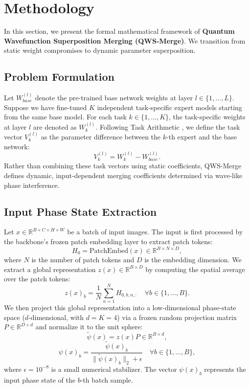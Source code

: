 \section{Methodology}
\label{sec:method}

In this section, we present the formal mathematical framework of \textbf{Quantum Wavefunction Superposition Merging (QWS-Merge)}. We transition from static weight compromises to dynamic parameter superposition.

\subsection{Problem Formulation}
Let $W_{base}^{(l)}$ denote the pre-trained base network weights at layer $l \in \{1, \dots, L\}$. Suppose we have fine-tuned $K$ independent task-specific expert models starting from the same base model. For each task $k \in \{1, \dots, K\}$, the task-specific weights at layer $l$ are denoted as $W_k^{(l)}$. Following Task Arithmetic \cite{ilharco2022editing}, we define the task vector $V_k^{(l)}$ as the parameter difference between the $k$-th expert and the base network:
\begin{equation}
    V_k^{(l)} = W_k^{(l)} - W_{base}^{(l)}.
\end{equation}
Rather than combining these task vectors using static coefficients, QWS-Merge defines dynamic, input-dependent merging coefficients determined via wave-like phase interference.

\subsection{Input Phase State Extraction}
Let $x \in \mathbb{R}^{B \times C \times H \times W}$ be a batch of input images. The input is first processed by the backbone's frozen patch embedding layer to extract patch tokens:
\begin{equation}
    H_0 = \text{PatchEmbed}(x) \in \mathbb{R}^{B \times N \times D},
\end{equation}
where $N$ is the number of patch tokens and $D$ is the embedding dimension. We extract a global representation $z(x) \in \mathbb{R}^{B \times D}$ by computing the spatial average over the patch tokens:
\begin{equation}
    z(x)_b = \frac{1}{N} \sum_{n=1}^N H_{0, b, n, :} \quad \forall b \in \{1, \dots, B\}.
\end{equation}
We then project this global representation into a low-dimensional phase-state space ($d$-dimensional, with $d = K = 4$) via a frozen random projection matrix $P \in \mathbb{R}^{D \times d}$ and normalize it to the unit sphere:
\begin{equation}
    \tilde{\psi}(x) = z(x) P \in \mathbb{R}^{B \times d},
\end{equation}
\begin{equation}
    \psi(x)_b = \frac{\tilde{\psi}(x)_b}{\|\tilde{\psi}(x)_b\|_2 + \epsilon} \quad \forall b \in \{1, \dots, B\},
\end{equation}
where $\epsilon = 10^{-8}$ is a small numerical stabilizer. The vector $\psi(x)_b$ represents the input phase state of the $b$-th batch sample.

